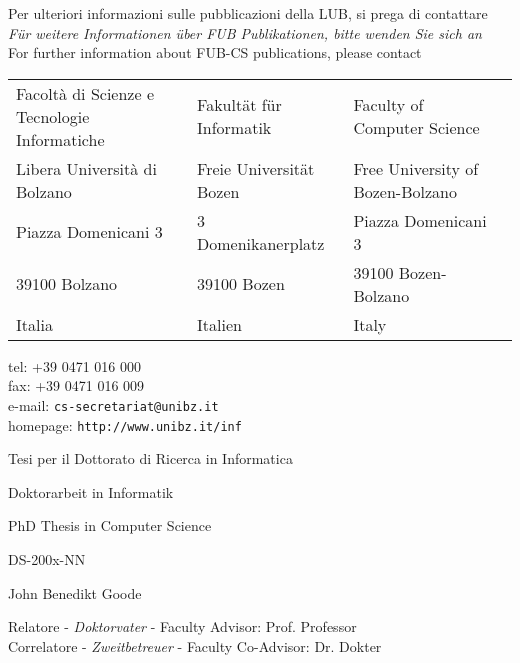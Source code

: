 {\begin{center}
Per ulteriori informazioni sulle pubblicazioni della LUB, si prega di contattare \\
\emph{F\"{u}r weitere Informationen \"{u}ber FUB Publikationen, bitte wenden Sie sich an}\\
For further information about FUB-CS publications, please contact\\
\begin{table}[!h]
	\centering
		\begin{tabular}{p{5cm}lll}
Facolt\`{a} di Scienze e Tecnologie Informatiche & Fakult\"{a}t f\"{u}r Informatik & Faculty of Computer Science \\
Libera Universit\`{a} di Bolzano & Freie Universit\"{a}t Bozen &  Free University of Bozen-Bolzano \\
Piazza Domenicani 3 & 3 Domenikanerplatz & Piazza Domenicani 3 \\
39100 Bolzano & 39100 Bozen & 39100 Bozen-Bolzano \\
Italia & Italien & Italy\\
		\end{tabular}
	\label{tab:address}
\end{table}
\vspace{-10pt}
tel: +39 0471 016 000\\
fax: +39 0471 016 009\\
e-mail: {\tt cs-secretariat@unibz.it}\\
homepage: {\tt http://www.unibz.it/inf}
\end{center}


\clearpage
\par\vskip 2cm
\begin{center}
\printtitle
\par\vspace {6cm}
{\large \sc Tesi per il Dottorato di Ricerca in Informatica}
\par\vspace {1cm}
{\large \sc Doktorarbeit in Informatik}
\par\vspace {1cm}
{\large \sc PhD Thesis in Computer Science}
\par\vspace {2cm}
{\large DS-200x-NN}			%
\par \vspace {5cm} 
{\Large John Benedikt Goode}  	%
\par\vspace {1cm} 
\end{center}

\clearpage
\noindent%
Relatore - \textit{Doktorvater} - Faculty Advisor: Prof. Professor\\ 		%
Correlatore - \textit{Zweitbetreuer} - Faculty Co-Advisor: Dr. Dokter\\ 	%

}
